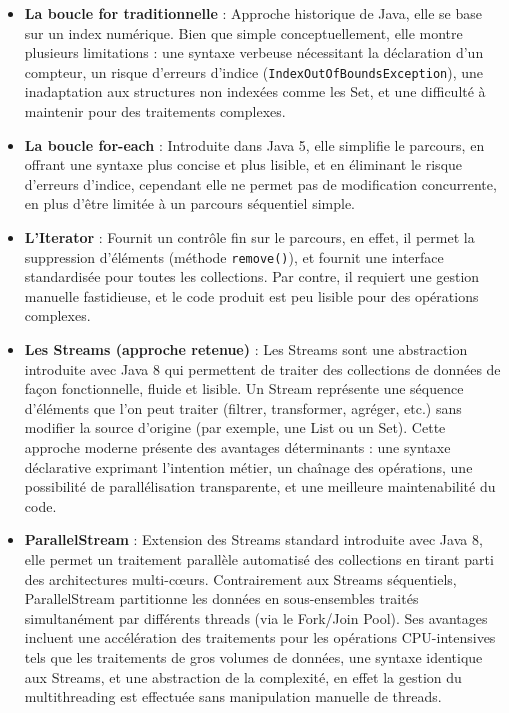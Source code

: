 \documentclass[12pt,a4paper]{report}
\begin{document}
	\begin{itemize}
		
		\item \textbf{La boucle for traditionnelle} : Approche historique de Java, elle se base sur un index numérique. Bien que simple conceptuellement, elle montre plusieurs limitations : une syntaxe verbeuse nécessitant la déclaration d'un compteur, un risque d'erreurs d'indice (\verb|IndexOutOfBoundsException|), une inadaptation aux structures non indexées comme les Set, et une difficulté à maintenir pour des traitements complexes.
		
		\item \textbf{La boucle for-each} : Introduite dans Java 5, elle simplifie le parcours, en offrant une syntaxe plus concise et plus lisible, et en éliminant le risque d'erreurs d'indice, cependant elle ne permet pas de modification concurrente, en plus d'être limitée à un parcours séquentiel simple.
		
		\item \textbf{L'Iterator} : Fournit un contrôle fin sur le parcours, en effet, il permet la suppression d'éléments (méthode \verb|remove()|), et fournit une interface standardisée pour toutes les collections. Par contre, il requiert une gestion manuelle fastidieuse, et le code produit est peu lisible pour des opérations complexes.
		
		\item \textbf{Les Streams (approche retenue)} :  Les Streams sont une abstraction introduite avec Java 8 qui permettent de traiter des collections de données de façon fonctionnelle, fluide et lisible. Un Stream représente une séquence d’éléments que l’on peut traiter (filtrer, transformer, agréger, etc.) sans modifier la source d’origine (par exemple, une List ou un Set). Cette approche moderne présente des avantages déterminants : une syntaxe déclarative exprimant l'intention métier, un chaînage des opérations, une possibilité de parallélisation transparente, et une meilleure maintenabilité du code.
		
		\item \textbf{ParallelStream} : Extension des Streams standard introduite avec Java 8, elle permet un traitement parallèle automatisé des collections en tirant parti des architectures multi-cœurs. Contrairement aux Streams séquentiels, ParallelStream partitionne les données en sous-ensembles traités simultanément par différents threads (via le Fork/Join Pool). Ses avantages incluent une accélération des traitements pour les opérations CPU-intensives tels que les traitements de gros volumes de données, une syntaxe identique aux Streams, et une abstraction de la complexité, en effet la gestion du multithreading est effectuée sans manipulation manuelle de threads.
		
	\end{itemize}
	
\end{document}
